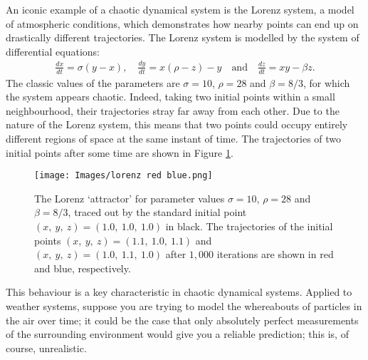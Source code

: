 \begin{exampple}
    An iconic example of a chaotic dynamical system is the Lorenz system, a model of atmospheric conditions\cite{lorenz1963deterministic}, which demonstrates how nearby points can end up on drastically different trajectories. The Lorenz system is modelled by the system of differential equations:
    \begin{align}
        \frac{dx}{dt} = \sigma (y-x), \quad \frac{dy}{dt} = x(\rho -z)-y \quad\text{and} \quad \frac{dz}{dt} = xy-\beta z.
    \end{align}\label{lorenzequation}
The classic values of the parameters are $\sigma=10$, $\rho=28$ and $\beta=8/3$, for which the system appears chaotic. Indeed, taking two initial points within a small neighbourhood, their trajectories stray far away from each other. Due to the nature of the Lorenz system, this means that two points could occupy entirely different regions of space at the same instant of time. The trajectories of two initial points after some time are shown in Figure \ref{fig:lorenzrb}.
\begin{figure}
    \centering
    \texttt{[image: Images/lorenz red blue.png]}
    \caption{The Lorenz `attractor' for parameter values $\sigma=10$, $\rho=28$ and $\beta=8/3$, traced out by the standard initial point $(x,\ y,\ z)=(1.0,\ 1.0,\ 1.0)$ in black. The trajectories of the initial points $(x,\ y,\ z)=(1.1,\ 1.0,\ 1.1)$ and $(x,\ y,\ z)=(1.0,\ 1.1,\ 1.0)$ after $1,000$ iterations are shown in red and blue, respectively.}
    \label{fig:lorenzrb}
\end{figure}
This behaviour is a key characteristic in chaotic dynamical systems. Applied to weather systems, suppose you are trying to model the whereabouts of particles in the air over time; it could be the case that only absolutely perfect measurements of the surrounding environment would give you a reliable prediction; this is, of course, unrealistic.
\end{exampple}
